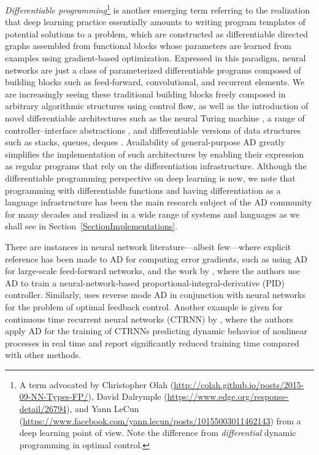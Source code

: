 \documentclass[twoside,11pt]{article}
\begin{document}
\emph{Differentiable programming}\footnote{A term advocated by Christopher Olah (\url{http://colah.github.io/posts/2015-09-NN-Types-FP/}), David Dalrymple (\url{https://www.edge.org/response-detail/26794}), and Yann LeCun (\url{https://www.facebook.com/yann.lecun/posts/10155003011462143}) from a deep learning point of view. Note the difference from \emph{differential} dynamic programming \citep{jacobson1970differential} in optimal control.} is another emerging term referring to the realization that deep learning practice essentially amounts to writing program templates of potential solutions to a problem, which are constructed as differentiable directed graphs assembled from functional blocks whose parameters are learned from examples using gradient-based optimization. Expressed in this paradigm, neural networks are just a class of parameterized differentiable programs composed of building blocks such as feed-forward, convolutional, and recurrent elements. We are increasingly seeing these traditional building blocks freely composed in arbitrary algorithmic structures using control flow, as well as the introduction of novel differentiable architectures such as the neural Turing machine \citep{graves2014neural}, a range of controller--interface abstractions \citep{graves2016hybrid,zaremba2016learning,joulin2015inferring,sukhbaatar2015end}, and differentiable versions of data structures such as stacks, queues, deques \citep{grefenstette2015learning}. Availability of general-purpose AD greatly simplifies the implementation of such architectures by enabling their expression as regular programs that rely on the differentiation infrastructure. Although the differentiable programming perspective on deep learning is new, we note that programming with differentiable functions and having differentiation as a language infrastructure has been the main research subject of the AD community for many decades and realized in a wide range of systems and languages as we shall see in Section~\ref{SectionImplementations}.

There are instances in neural network literature---albeit few---where explicit reference has been made to AD for computing error gradients, such as \citet{Eriksson1998} using AD for large-scale feed-forward networks, and the work by \citet{Yang2008}, where the authors use AD to train a neural-network-based proportional-integral-derivative (PID) controller. Similarly, \citet{Rollins2009} uses reverse mode AD in conjunction with neural networks for the problem of optimal feedback control. Another example is given for continuous time recurrent neural networks (CTRNN) by \citet{AlSeyab2008}, where the authors apply AD for the training of CTRNNs predicting dynamic behavior of nonlinear processes in real time and report significantly reduced training time compared with other methods.
\end{document}
